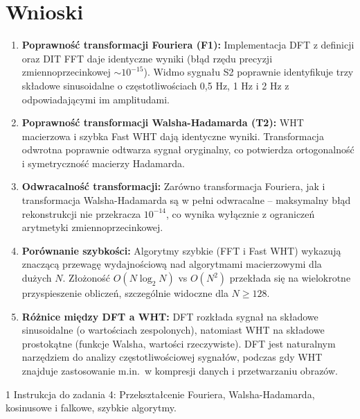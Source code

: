 \documentclass[12pt]{article}
\begin{document}
\section{Wnioski}

\begin{enumerate}
    \item \textbf{Poprawność transformacji Fouriera (F1):} Implementacja DFT z definicji oraz DIT FFT daje identyczne wyniki (błąd rzędu precyzji zmiennoprzecinkowej $\sim 10^{-15}$). Widmo sygnału S2 poprawnie identyfikuje trzy składowe sinusoidalne o częstotliwościach 0,5 Hz, 1 Hz i 2 Hz z odpowiadającymi im amplitudami.

    \item \textbf{Poprawność transformacji Walsha-Hadamarda (T2):} WHT macierzowa i szybka Fast WHT dają identyczne wyniki. Transformacja odwrotna poprawnie odtwarza sygnał oryginalny, co potwierdza ortogonalność i symetryczność macierzy Hadamarda.

    \item \textbf{Odwracalność transformacji:} Zarówno transformacja Fouriera, jak i transformacja Walsha-Hadamarda są w pełni odwracalne -- maksymalny błąd rekonstrukcji nie przekracza $10^{-14}$, co wynika wyłącznie z ograniczeń arytmetyki zmiennoprzecinkowej.

    \item \textbf{Porównanie szybkości:} Algorytmy szybkie (FFT i Fast WHT) wykazują znaczącą przewagę wydajnościową nad algorytmami macierzowymi dla dużych $N$. Złożoność $O(N \log_2 N)$ vs $O(N^2)$ przekłada się na wielokrotne przyspieszenie obliczeń, szczególnie widoczne dla $N \geq 128$.

    \item \textbf{Różnice między DFT a WHT:} DFT rozkłada sygnał na składowe sinusoidalne (o wartościach zespolonych), natomiast WHT na składowe prostokątne (funkcje Walsha, wartości rzeczywiste). DFT jest naturalnym narzędziem do analizy częstotliwościowej sygnałów, podczas gdy WHT znajduje zastosowanie m.in.\ w kompresji danych i przetwarzaniu obrazów.
\end{enumerate}

\begin{thebibliography}{1}
 Instrukcja do zadania 4: Przekształcenie Fouriera, Walsha-Hadamarda, kosinusowe i falkowe, szybkie algorytmy.
\end{thebibliography}
\end{document}
